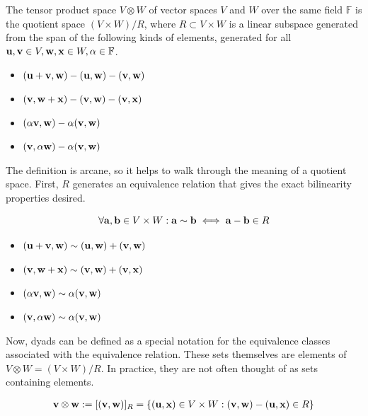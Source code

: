\begin{definition}
	The tensor product space $V \otimes W$ of vector spaces $V$ and $W$ over the same field $\mathbb{F}$ is the quotient space $(V \times W) / R$, where $R \subset V \times W$ is a linear subspace generated from the span of the following kinds of elements, generated for all $\vb{u}, \vb{v} \in V, \vb{w}, \vb{x} \in W, \alpha \in \mathbb{F}$.
	\begin{itemize}
		\item $(\vb{u} + \vb{v}, \vb{w}) - (\vb{u}, \vb{w}) - (\vb{v}, \vb{w})$
		\item $(\vb{v}, \vb{w} + \vb{x}) - (\vb{v}, \vb{w}) - (\vb{v}, \vb{x})$
		\item $(\alpha \vb{v}, \vb{w}) - \alpha (\vb{v}, \vb{w})$
		\item $(\vb{v}, \alpha \vb{w}) - \alpha (\vb{v}, \vb{w})$
	\end{itemize}
\end{definition}

The definition is arcane, so it helps to walk through the meaning of a quotient space. First, $R$ generates an equivalence relation that gives the exact bilinearity properties desired.

\begin{equation}
	\forall \vb{a}, \vb{b} \in V \times W: \vb{a} \sim \vb{b} \iff \vb{a} - \vb{b} \in R
\end{equation}

\begin{itemize}
	\item $(\vb{u} + \vb{v}, \vb{w}) \sim (\vb{u}, \vb{w}) + (\vb{v}, \vb{w})$
	\item $(\vb{v}, \vb{w} + \vb{x}) \sim (\vb{v}, \vb{w}) + (\vb{v}, \vb{x})$
	\item $(\alpha \vb{v}, \vb{w}) \sim \alpha (\vb{v}, \vb{w})$
	\item $(\vb{v}, \alpha \vb{w}) \sim \alpha (\vb{v}, \vb{w})$
\end{itemize}

Now, dyads can be defined as a special notation for the equivalence classes associated with the equivalence relation. These sets themselves are elements of $V \otimes W = (V \times W) / R$. In practice, they are not often thought of as sets containing elements.

\begin{align}
	\vb{v} \otimes \vb{w}:= [(\vb{v}, \vb{w})]_{R} = \{(\vb{u}, \vb{x}) \in V \times W: (\vb{v}, \vb{w}) - (\vb{u}, \vb{x}) \in R\}
\end{align}

